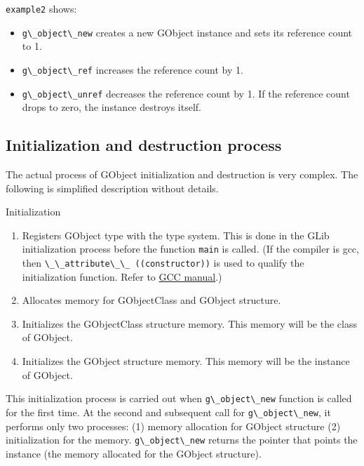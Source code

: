 \passthrough{\lstinline!example2!} shows:

\begin{itemize}
\tightlist
\item
  \passthrough{\lstinline!g\_object\_new!} creates a new GObject
  instance and sets its reference count to 1.
\item
  \passthrough{\lstinline!g\_object\_ref!} increases the reference count
  by 1.
\item
  \passthrough{\lstinline!g\_object\_unref!} decreases the reference
  count by 1. If the reference count drops to zero, the instance
  destroys itself.
\end{itemize}

\subsection{Initialization and destruction
process}\label{initialization-and-destruction-process}

The actual process of GObject initialization and destruction is very
complex. The following is simplified description without details.

Initialization

\begin{enumerate}
\def\labelenumi{\arabic{enumi}.}
\tightlist
\item
  Registers GObject type with the type system. This is done in the GLib
  initialization process before the function
  \passthrough{\lstinline!main!} is called. (If the compiler is gcc,
  then \passthrough{\lstinline!\_\_attribute\_\_ ((constructor))!} is
  used to qualify the initialization function. Refer to
  \href{https://gcc.gnu.org/onlinedocs/gcc-10.2.0/gcc/Common-Function-Attributes.html\#Common-Function-Attributes}{GCC
  manual}.)
\item
  Allocates memory for GObjectClass and GObject structure.
\item
  Initializes the GObjectClass structure memory. This memory will be the
  class of GObject.
\item
  Initializes the GObject structure memory. This memory will be the
  instance of GObject.
\end{enumerate}

This initialization process is carried out when
\passthrough{\lstinline!g\_object\_new!} function is called for the
first time. At the second and subsequent call for
\passthrough{\lstinline!g\_object\_new!}, it performs only two
processes: (1) memory allocation for GObject structure (2)
initialization for the memory. \passthrough{\lstinline!g\_object\_new!}
returns the pointer that points the instance (the memory allocated for
the GObject structure).

